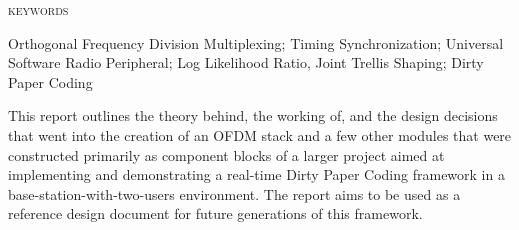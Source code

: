 \abstract

\noindent \textsc{keywords} \hspace*{0.5em} \parbox[t]{4.4in} {Orthogonal
Frequency Division Multiplexing; Timing Synchronization; Universal Software
Radio Peripheral; Log Likelihood Ratio, Joint Trellis Shaping; Dirty Paper
Coding}

\vspace*{24pt}

\noindent This report outlines the theory behind, the working of, and the
design decisions that went into the creation of an OFDM stack and a few other
modules that were constructed primarily as component blocks of a larger
project aimed at implementing and demonstrating a real-time Dirty Paper Coding
framework in a base-station-with-two-users environment. The report aims to be
used as a reference design document for future generations of this framework.
